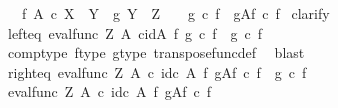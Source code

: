 \begin{isabellebody}
\ \ \ {\isachardoublequoteopen}f{\isacharcolon}{\kern0pt}\ A\ {\isasymtimes}\isactrlsub c\ X\ {\isasymrightarrow}\ Y\ {\isasymand}\ g{\isacharcolon}{\kern0pt}\ Y\ {\isasymrightarrow}\ Z\ \ {\isasymLongrightarrow}\ \ {\isacharparenleft}{\kern0pt}g\ {\isasymcirc}\isactrlsub c\ f{\isacharparenright}{\kern0pt}\isactrlsup {\isasymsharp}\ {\isacharequal}{\kern0pt}\ g\isactrlbsup A\isactrlesup \isactrlsub f\ {\isasymcirc}\isactrlsub c\ f\isactrlsup {\isasymsharp}{\isachardoublequoteclose}\isanewline
%
\isadelimproof
%
\endisadelimproof
%
\isatagproof
{}\isamarkupfalse%
\ clarify\isanewline
\ \ \isamarkupfalse%
\ left{\isacharunderscore}{\kern0pt}eq{\isacharcolon}{\kern0pt}\ {\isachardoublequoteopen}{\isacharparenleft}{\kern0pt}eval{\isacharunderscore}{\kern0pt}func\ Z\ A{\isacharparenright}{\kern0pt}\ {\isasymcirc}\isactrlsub c{\isacharparenleft}{\kern0pt}id{\isacharparenleft}{\kern0pt}A{\isacharparenright}{\kern0pt}\ {\isasymtimes}\isactrlsub f\ {\isacharparenleft}{\kern0pt}g\ {\isasymcirc}\isactrlsub c\ f{\isacharparenright}{\kern0pt}\isactrlsup {\isasymsharp}{\isacharparenright}{\kern0pt}\ {\isacharequal}{\kern0pt}\ g\ {\isasymcirc}\isactrlsub c\ f{\isachardoublequoteclose}\isanewline
\ \ \ \ \isamarkupfalse%
\ comp{\isacharunderscore}{\kern0pt}type\ f{\isacharunderscore}{\kern0pt}type\ g{\isacharunderscore}{\kern0pt}type\ transpose{\isacharunderscore}{\kern0pt}func{\isacharunderscore}{\kern0pt}def\ \isamarkupfalse%
\ blast\isanewline
\ \ \isamarkupfalse%
\ right{\isacharunderscore}{\kern0pt}eq{\isacharcolon}{\kern0pt}\ {\isachardoublequoteopen}{\isacharparenleft}{\kern0pt}eval{\isacharunderscore}{\kern0pt}func\ Z\ A{\isacharparenright}{\kern0pt}\ {\isasymcirc}\isactrlsub c\ {\isacharparenleft}{\kern0pt}id\isactrlsub c\ A\ {\isasymtimes}\isactrlsub f\ {\isacharparenleft}{\kern0pt}g\isactrlbsup A\isactrlesup \isactrlsub f\ {\isasymcirc}\isactrlsub c\ f\isactrlsup {\isasymsharp}{\isacharparenright}{\kern0pt}{\isacharparenright}{\kern0pt}\ {\isacharequal}{\kern0pt}\ g\ {\isasymcirc}\isactrlsub c\ f{\isachardoublequoteclose}\isanewline
\ \ \isamarkupfalse%
\ {\isacharminus}{\kern0pt}\ \isanewline
\ \ \ \ \isamarkupfalse%
\ {\isachardoublequoteopen}{\isacharparenleft}{\kern0pt}eval{\isacharunderscore}{\kern0pt}func\ Z\ A{\isacharparenright}{\kern0pt}\ {\isasymcirc}\isactrlsub c\ {\isacharparenleft}{\kern0pt}id\isactrlsub c\ A\ {\isasymtimes}\isactrlsub f\ {\isacharparenleft}{\kern0pt}g\isactrlbsup A\isactrlesup \isactrlsub f\ {\isasymcirc}\isactrlsub c\ f\isactrlsup {\isasymsharp}{\isacharparenright}{\kern0pt}{\isacharparenright}{\kern0pt}\ {\isacharequal}{\kern0pt}\isanewline

\end{isabellebody}
